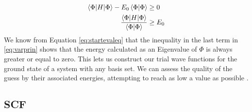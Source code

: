 \documentclass[../master_thesis.tex]{subfiles}
\begin{document}
\begin{equation}
  \begin{split} \label{eq:varprin}
    \braket{\Phi | H | \Phi} - E_0\braket{\Phi | \Phi} & \geq 0 \\
    \frac{\braket{\Phi | H | \Phi}}{\braket{\Phi | \Phi}} & \geq E_0
  \end{split}
\end{equation}
We know from Equation \ref{eq:startevaleq} that the inequality in the last term in
\ref{eq:varprin} shows that the energy calculated as an Eigenvalue of $\Phi$ is
always greater or equal to zero. This lets us construct our trial wave functions
for the ground state of a system with any basis set. We can assess the quality
of the guess by their associated energies, attempting to reach as low a value
as possible \cite{Cramer:2004}.

\subsection{\ac{SCF}}


\biblio
\end{document}
